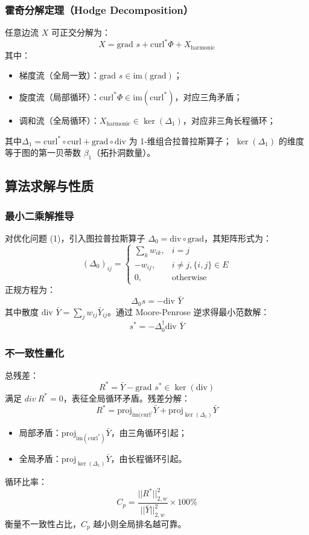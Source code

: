 \documentclass[a4paper]{article}
\begin{document}
\subsubsection{霍奇分解定理（Hodge Decomposition）}
任意边流 $X$ 可正交分解为：
$$
X = \text{grad } s + \text{curl}^* \Phi + X_{\text{harmonic}} 
$$
其中：
\begin{itemize}
    \item 梯度流（全局一致）：$\text{grad } s \in \text{im}(\text{grad})$；
    \item 旋度流（局部循环）：$\text{curl}^* \Phi \in \text{im}(\text{curl}^*)$，对应三角矛盾；
    \item 调和流（全局循环）：$X_{\text{harmonic}} \in \ker(\Delta_1)$，对应非三角长程循环；
\end{itemize}
其中$\Delta_1 = \text{curl}^* \circ \text{curl} + \text{grad} \circ \text{div}$ 为 1-维组合拉普拉斯算子；
 $\ker(\Delta_1)$ 的维度等于图的第一贝蒂数 $\beta_1$（拓扑洞数量）。

\subsection{算法求解与性质}

\subsubsection{最小二乘解推导}
对优化问题 (1)，引入图拉普拉斯算子 $\Delta_0 = \text{div} \circ \text{grad}$，其矩阵形式为：
$$
(\Delta_0)_{ij} = 
\begin{cases} 
\sum_k w_{ik}, & i = j \\
-w_{ij}, & i \neq j, \{i,j\} \in E \\
0, & \text{otherwise}
\end{cases}
$$
正规方程为：
$$
\Delta_0 s = -\text{div } \bar{Y} 
$$
其中散度 $\text{div } \bar{Y} = \sum_j w_{ij} \bar{Y}_{ij}$。通过 Moore-Penrose 逆求得最小范数解：
$$
s^* = -\Delta_0^{\dagger} \text{div } \bar{Y}
$$

\subsubsection{不一致性量化}
总残差：
$$
R^* = \bar{Y} - \text{grad } s^* \in \ker(\text{div}) 
$$
满足 $ div\ R^*  = 0 $，表征全局循环矛盾。残差分解：
$$
R^* = \text{proj}_{\text{im}(\text{curl}^)} \bar{Y} + \text{proj}_{\ker(\Delta_1)} \bar{Y}
$$
\begin{itemize}
    \item 局部矛盾：$\text{proj}_{\text{im}(\text{curl}^*)} \bar{Y}$，由三角循环引起；
    \item 全局矛盾：$\text{proj}_{\ker(\Delta_1)} \bar{Y}$，由长程循环引起。
\end{itemize}
循环比率：
$$
C_p = \frac{||R^*||_{2,w}^2}{||\bar{Y}||_{2,w}^2} \times 100\%
$$
衡量不一致性占比，$C_p$ 越小则全局排名越可靠。
\end{document}
